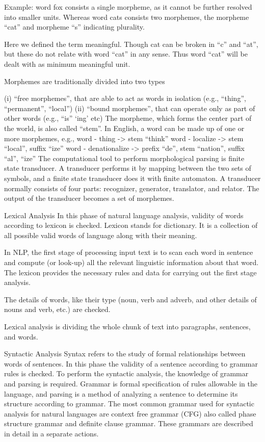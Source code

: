Example: word fox consists a single morpheme, as it cannot be further resolved into smaller units. Whereas word cats consists two morphemes, the morpheme “cat” and morpheme “s” indicating plurality.

Here we defined the term meaningful. Though cat can be broken in “c” and “at”, but these do not relate with word “cat” in any sense. Thus word “cat” will be dealt with as minimum meaningful unit.

Morphemes are traditionally divided into two types

(i) “free morphemes”, that are able to act as words in isolation (e.g., “thing”, “permanent”, “local”)
(ii) “bound morphemes”, that can operate only as part of other words (e.g., “is” ‘ing’ etc) The morpheme, which forms the center part of the world, is also called “stem”. In English, a word can be made up of one or more morphemes, e.g.,
word - thing -> stem “think”
word - localize -> stem “local”, suffix “ize”
word - denationalize -> prefix “de”, stem “nation”, suffix “al”, “ize”
The computational tool to perform morphological parsing is finite state transducer. A transducer performs it by mapping between the two sets of symbols, and a finite state transducer does it with finite automaton. A transducer normally consists of four parts: recognizer, generator, translator, and relator. The output of the transducer becomes a set of morphemes.

Lexical Analysis
In this phase of natural language analysis, validity of words according to lexicon is checked. Lexicon stands for dictionary. It is a collection of all possible valid words of language along with their meaning.

In NLP, the first stage of processing input text is to scan each word in sentence and compute (or look-up) all the relevant linguistic information about that word. The lexicon provides the necessary rules and data for carrying out the first stage analysis.

The details of words, like their type (noun, verb and adverb, and other details of nouns and verb, etc.) are checked.



Lexical analysis is dividing the whole chunk of text into paragraphs, sentences, and words.

Syntactic Analysis
Syntax refers to the study of formal relationships between words of sentences. In this phase the validity of a sentence according to grammar rules is checked. To perform the syntactic analysis, the knowledge of grammar and parsing is required. Grammar is formal specification of rules allowable in the language, and parsing is a method of analyzing a sentence to determine its structure according to grammar. The most common grammar used for syntactic analysis for natural languages are context free grammar (CFG) also called phase structure grammar and definite clause grammar. These grammars are described in detail in a separate actions.


